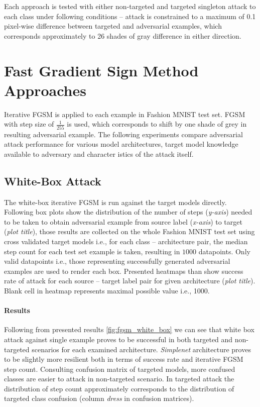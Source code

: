 Each approach is tested with either non-targeted and targeted singleton attack to each class under following conditions -- attack is constrained  to a maximum of 0.1 pixel-wise difference between targeted and adversarial examples, which corresponds approximately to 26 shades of gray difference in either direction.

\section{Fast Gradient Sign Method Approaches}
Iterative FGSM is applied to each example in Fashion MNIST test set. FGSM with step size of $\frac{1}{255}$ is used, which corresponds to shift by one shade of grey in resulting adversarial example. The following experiments compare adversarial attack performance for various model architectures, target model knowledge available to adversary and character istics of the attack itself.

\subsection{White-Box Attack}
The white-box iterative FGSM is run against the target models directly. Following box plots show the distribution of the number of steps (\textit{y-axis}) needed to be taken to obtain adversarial example from source label (\textit{x-axis}) to target (\textit{plot title}), those results are collected on the whole Fashion MNIST test set using cross validated target models i.e., for each class -- architecture pair, the median step count for each test set example is taken, resulting in $1000$ datapoints. Only valid datapoints i.e., those representing successfully generated adversarial examples are used to render each box. Presented heatmaps than show success rate of attack for each source -- target label pair for given architecture (\textit{plot title}). Blank cell in heatmap represents maximal possible value i.e., 1000.

\paragraph{Results}

Following from presented results \ref{fig:fgsm_white_box} we can see that white box attack against single example proves to be successful in both targeted and non-targeted scenarios for each examined architecture. \textit{Simplenet} architecture proves to be slightly more resilient both in terms of success rate and iterative FGSM step count. Consulting confusion matrix of targeted models, more confused classes are easier to attack in non-targeted scenario. In targeted attack the distribution of step count approximately corresponds to the distribution of targeted class confusion (column \textit{dress} in confusion matrices).

